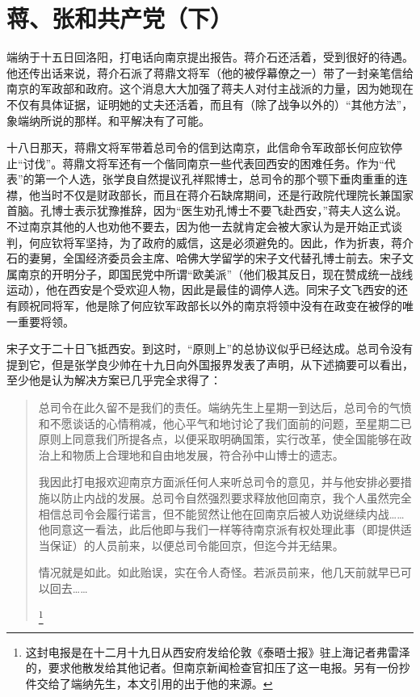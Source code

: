 \documentclass[10pt]{book}
\begin{document}
\section{蒋、张和共产党（下）}

端纳于十五日回洛阳，打电话向南京提出报告。蒋介石还活着，受到很好的待遇。他还传出话来说，蒋介石派了蒋鼎文将军（他的被俘幕僚之一）带了一封亲笔信给南京的军政部和政府。这个消息大大加强了蒋夫人对付主战派的力量，因为她现在不仅有具体证据，证明她的丈夫还活着，而且有（除了战争以外的）“其他方法”，象端纳所说的那样。和平解决有了可能。

十八日那天，蒋鼎文将军带着总司令的信到达南京，此信命令军政部长何应钦停止“讨伐”。蒋鼎文将军还有一个偕同南京一些代表回西安的困难任务。作为“代表”的第一个人选，张学良自然提议孔祥熙博士，总司令的那个颚下垂肉重重的连襟，他当时不仅是财政部长，而且在蒋介石缺席期间，还是行政院代理院长兼国家首脑。孔博士表示犹豫推辞，因为“医生劝孔博士不要飞赴西安，”蒋夫人这么说。不过南京其他的人也劝他不要去，因为他一去就肯定会被大家认为是开始正式谈判，何应钦将军坚持，为了政府的威信，这是必须避免的。因此，作为折衷，蒋介石的妻舅，全国经济委员会主席、哈佛大学留学的宋子文代替孔博士前去。宋子文属南京的开明分子，即国民党中所谓“欧美派”（他们极其反日，现在赞成统一战线运动），他在西安是个受欢迎人物，因此是最佳的调停人选。同宋子文飞西安的还有顾祝同将军，他是除了何应钦军政部长以外的南京将领中没有在政变在被俘的唯一重要将领。

宋子文于二十日飞抵西安。到这时，“原则上”的总协议似乎已经达成。总司令没有提到它，但是张学良少帅在十九日向外国报界发表了声明，从下述摘要可以看出，至少他是认为解决方案已几乎完全求得了：

\begin{quote}
总司令在此久留不是我们的责任。端纳先生上星期一到达后，总司令的气愤和不愿谈话的心情稍减，他心平气和地讨论了我们面前的问题，至星期二已原则上同意我们所提各点，以便采取明确国策，实行改革，使全国能够在政治上和物质上合理地和自由地发展，符合孙中山博士的遗志。

我因此打电报欢迎南京方面派任何人来听总司令的意见，并与他安排必要措施以防止内战的发展。总司令自然强烈要求释放他回南京，我个人虽然完全相信总司令会履行诺言，但不能贸然让他在回南京后被人劝说继续内战……他同意这一看法，此后他即与我们一样等待南京派有权处理此事（即提供适当保证）的人员前来，以便总司令能回京，但迄今并无结果。

情况就是如此。如此贻误，实在令人奇怪。若派员前来，他几天前就早已可以回去……

\footnote{这封电报是在十二月十九日从西安府发给伦敦《泰晤士报》驻上海记者弗雷泽的，要求他散发给其他记者。但南京新闻检查官扣压了这一电报。另有一份抄件交给了端纳先生，本文引用的出于他的来源。}
\end{quote}
\end{document}
